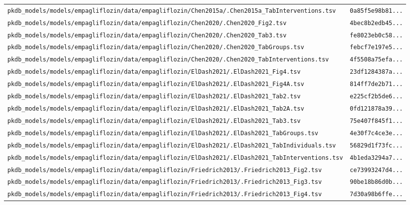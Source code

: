 \documentclass{article}
\begin{document}
\begin{longtable}{ll}
\texttt{pkdb\_models/models/empagliflozin/data/empagliflozin/Chen2015a/.Chen2015a\_TabInterventions.tsv} & \texttt{0a85f5e98b81...} \\
\texttt{pkdb\_models/models/empagliflozin/data/empagliflozin/Chen2020/.Chen2020\_Fig2.tsv} & \texttt{4bec8b2edb45...} \\
\texttt{pkdb\_models/models/empagliflozin/data/empagliflozin/Chen2020/.Chen2020\_Tab3.tsv} & \texttt{fe8023eb0c58...} \\
\texttt{pkdb\_models/models/empagliflozin/data/empagliflozin/Chen2020/.Chen2020\_TabGroups.tsv} & \texttt{febcf7e197e5...} \\
\texttt{pkdb\_models/models/empagliflozin/data/empagliflozin/Chen2020/.Chen2020\_TabInterventions.tsv} & \texttt{4f5508a75efa...} \\
\texttt{pkdb\_models/models/empagliflozin/data/empagliflozin/ElDash2021/.ElDash2021\_Fig4.tsv} & \texttt{23df1284387a...} \\
\texttt{pkdb\_models/models/empagliflozin/data/empagliflozin/ElDash2021/.ElDash2021\_Fig4A.tsv} & \texttt{814ff7de2b71...} \\
\texttt{pkdb\_models/models/empagliflozin/data/empagliflozin/ElDash2021/.ElDash2021\_Tab2.tsv} & \texttt{e225cf2b5de6...} \\
\texttt{pkdb\_models/models/empagliflozin/data/empagliflozin/ElDash2021/.ElDash2021\_Tab2A.tsv} & \texttt{0fd121878a39...} \\
\texttt{pkdb\_models/models/empagliflozin/data/empagliflozin/ElDash2021/.ElDash2021\_Tab3.tsv} & \texttt{75e407f845f1...} \\
\texttt{pkdb\_models/models/empagliflozin/data/empagliflozin/ElDash2021/.ElDash2021\_TabGroups.tsv} & \texttt{4e30f7c4ce3e...} \\
\texttt{pkdb\_models/models/empagliflozin/data/empagliflozin/ElDash2021/.ElDash2021\_TabIndividuals.tsv} & \texttt{56829d1f73fc...} \\
\texttt{pkdb\_models/models/empagliflozin/data/empagliflozin/ElDash2021/.ElDash2021\_TabInterventions.tsv} & \texttt{4b1eda3294a7...} \\
\texttt{pkdb\_models/models/empagliflozin/data/empagliflozin/Friedrich2013/.Friedrich2013\_Fig2.tsv} & \texttt{ce73993247d4...} \\
\texttt{pkdb\_models/models/empagliflozin/data/empagliflozin/Friedrich2013/.Friedrich2013\_Fig3.tsv} & \texttt{90be18b86d0b...} \\
\texttt{pkdb\_models/models/empagliflozin/data/empagliflozin/Friedrich2013/.Friedrich2013\_Fig4.tsv} & \texttt{7d30a98b6ffe...} \\

\end{longtable}
\end{document}
